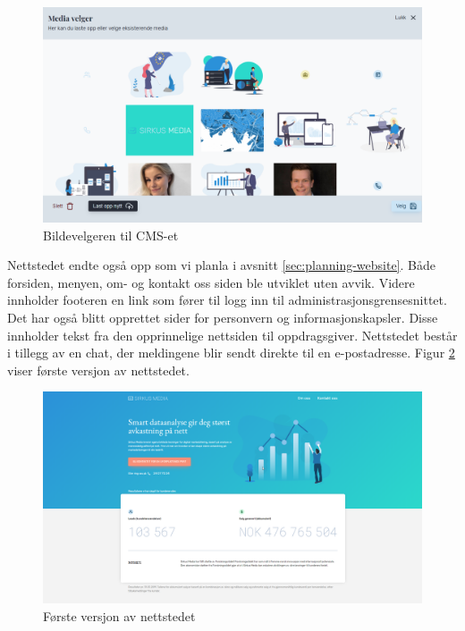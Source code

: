 \begin{figure}[H]
    \centering
    \includegraphics[width=\textwidth]{brukerveiledning/media-picker.png}
    \caption{Bildevelgeren til CMS-et}
    \label{fig:media-picker-cms}
\end{figure}

Nettstedet endte også opp som vi planla i avsnitt \ref{sec:planning-website}. Både forsiden, menyen, om- og kontakt oss siden ble utviklet uten avvik. Videre innholder footeren en link som fører til logg inn til administrasjonsgrensesnittet. Det har også blitt opprettet sider for personvern og informasjonskapsler. Disse innholder tekst fra den opprinnelige nettsiden til oppdragsgiver. Nettstedet består i tillegg av en chat, der meldingene blir sendt direkte til en e-postadresse. Figur \ref{fig:first-version-website} viser første versjon av nettstedet.

\begin{figure}[H]
    \centering
    \includegraphics[width=\textwidth]{versjon-1-nettsted.png}
    \caption{Første versjon av nettstedet}
    \label{fig:first-version-website}
\end{figure}